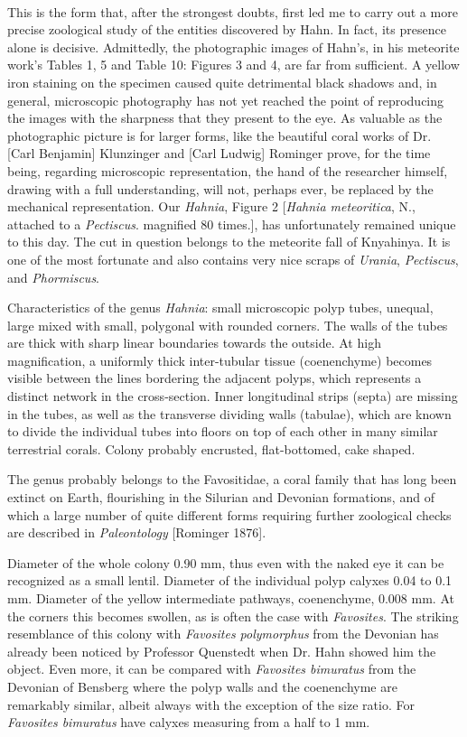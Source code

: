 \documentclass[a4paper, 12pt, oneside]{article}
\begin{document}
\paragraph{}
This is the form that, after the strongest doubts, first led me to carry out a more precise zoological study of the entities discovered by Hahn. In fact, its presence alone is decisive. Admittedly, the photographic images of Hahn's, in his meteorite work's Tables 1, 5 and Table 10: Figures 3 and 4, are far from sufficient. A yellow iron staining on the specimen caused quite detrimental black shadows and, in general, microscopic photography has not yet reached the point of reproducing the images with the sharpness that they present to the eye. As valuable as the photographic picture is for larger forms, like the beautiful coral works of Dr. [Carl Benjamin] Klunzinger and [Carl Ludwig] Rominger prove, for the time being, regarding microscopic representation, the hand of the researcher himself, drawing with a full understanding, will not, perhaps ever, be replaced by the mechanical representation. Our \emph{Hahnia}, Figure 2 [\emph{Hahnia meteoritica}, N., attached to a \emph{Pectiscus}. magnified 80 times.], has unfortunately remained unique to this day. The cut in question belongs to the meteorite fall of Knyahinya. It is one of the most fortunate and also contains very nice scraps of \emph{Urania}, \emph{Pectiscus}, and \emph{Phormiscus}.

Characteristics of the genus \emph{Hahnia}: small microscopic polyp tubes, unequal, large mixed with small, polygonal with rounded corners. The walls of the tubes are thick with sharp linear boundaries towards the outside. At high magnification, a uniformly thick inter-tubular tissue (coenenchyme) becomes visible between the lines bordering the adjacent polyps, which represents a distinct network in the cross-section. Inner longitudinal strips (septa) are missing in the tubes, as well as the transverse dividing walls (tabulae), which are known to divide the individual tubes into floors on top of each other in many similar terrestrial corals. Colony probably encrusted, flat-bottomed, cake shaped.

The genus probably belongs to the Favositidae, a coral family that has long been extinct on Earth, flourishing in the Silurian and Devonian formations, and of which a large number of quite different forms requiring further zoological checks are described in \emph{Paleontology} [Rominger 1876].

Diameter of the whole colony 0.90 mm, thus even with the naked eye it can be recognized as a small lentil. Diameter of the individual polyp calyxes 0.04 to 0.1 mm. Diameter of the yellow intermediate pathways, coenenchyme, 0.008 mm. At the corners this becomes swollen, as is often the case with \emph{Favosites}. The striking resemblance of this colony with \emph{Favosites polymorphus} from the Devonian has already been noticed by Professor Quenstedt when Dr. Hahn showed him the object. Even more, it can be compared with \emph{Favosites bimuratus} from the Devonian of Bensberg where the polyp walls and the coenenchyme are remarkably similar, albeit always with the exception of the size ratio. For \emph{Favosites bimuratus} have calyxes measuring from a half to 1 mm.
\end{document}
